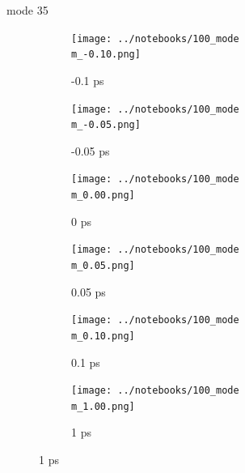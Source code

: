 \documentclass{beamer}
\begin{document}
\renewcommand\m{35}
\begin{frame}{mode \m}
	\begin{figure}
		\centering
		\begin{subfigure}[b]{\w\textwidth}
			\centering
			\texttt{[image: ../notebooks/100\_mode\\m\_-0.10.png]}
			\caption{-0.1 ps}
		\end{subfigure}
		\begin{subfigure}[b]{\w\textwidth}
			\centering
			\texttt{[image: ../notebooks/100\_mode\\m\_-0.05.png]}
			\caption{-0.05 ps}
		\end{subfigure}
		\begin{subfigure}[b]{\w\textwidth}
			\centering
			\texttt{[image: ../notebooks/100\_mode\\m\_0.00.png]}
			\caption{0 ps}
		\end{subfigure}
		\begin{subfigure}[b]{\w\textwidth}
			\centering
			\texttt{[image: ../notebooks/100\_mode\\m\_0.05.png]}
			\caption{0.05 ps}
		\end{subfigure}
		\begin{subfigure}[b]{\w\textwidth}
			\centering
			\texttt{[image: ../notebooks/100\_mode\\m\_0.10.png]}
			\caption{0.1 ps}
		\end{subfigure}
		\begin{subfigure}[b]{\w\textwidth}
			\centering
			\texttt{[image: ../notebooks/100\_mode\\m\_1.00.png]}
			\caption{1 ps}
		\end{subfigure}
	\end{figure}
\end{frame}
\end{document}
